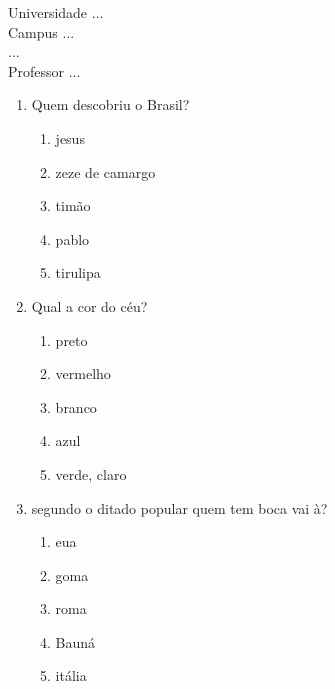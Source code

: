 \documentclass[10pt,a4paper,twocolumn]{report}
\begin{document}
\begin{flushleft}
Universidade ...\\
Campus ...\\
...\\
Professor ...\\
\end{flushleft}




 \begin{enumerate} 
    \item  Quem descobriu o Brasil?





    \begin{enumerate}
    \item  jesus

\item  zeze de camargo

\item  timão

\item  pablo

\item  tirulipa


    \end{enumerate} 
    \item  Qual a cor do céu?





    \begin{enumerate}
    \item  preto

\item  vermelho

\item  branco

\item  azul

\item  verde, claro


    \end{enumerate} 
    \item  segundo o ditado popular quem tem boca vai à?





    \begin{enumerate}
    \item  eua

\item  goma

\item  roma

\item  Bauná

\item  itália


    \end{enumerate}\end{enumerate} 
\end{document}
